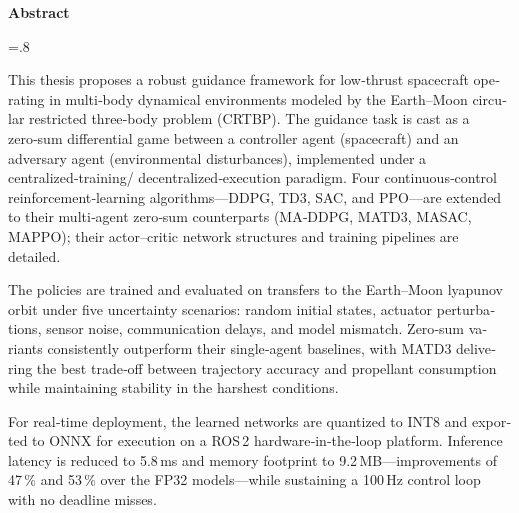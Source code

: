 


\pagestyle{empty}

\begin{latin}
	
	\begin{center}
		\textbf{Abstract}
	\end{center}
	\baselineskip=.8\baselineskip
	\noindent
	
\noindent This thesis proposes a robust guidance framework for low‑thrust spacecraft operating in multi‑body dynamical environments modeled by the Earth–Moon circular restricted three‑body problem (CRTBP). The guidance task is cast as a zero‑sum differential game between a controller agent (spacecraft) and an adversary agent (environmental disturbances), implemented under a centralized‑training/ decentralized‑execution paradigm. Four continuous‑control reinforcement‑learning algorithms—DDPG, TD3, SAC, and PPO—are extended to their multi‑agent zero‑sum counterparts (MA‑DDPG, MATD3, MASAC, MAPPO); their actor–critic network structures and training pipelines are detailed.

The policies are trained and evaluated on transfers to the Earth–Moon  lyapunov orbit under five uncertainty scenarios: random initial states, actuator perturbations, sensor noise, communication delays, and model mismatch. Zero‑sum variants consistently outperform their single‑agent baselines, with MATD3 delivering the best trade‑off between trajectory accuracy and propellant consumption while maintaining stability in the harshest conditions.

For real‑time deployment, the learned networks are quantized to INT8 and exported to ONNX for execution on a ROS 2 hardware‑in‑the‑loop platform. Inference latency is reduced to 5.8 ms and memory footprint to 9.2 MB—improvements of 47 \% and 53 \% over the FP32 models—while sustaining a 100 Hz control loop with no deadline misses.


\end{latin}
